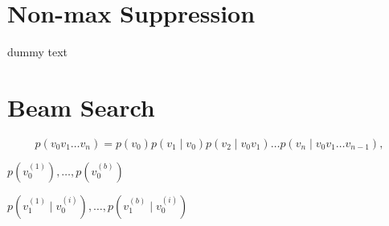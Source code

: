 \section{Non-max Suppression}\label{app:nms}
dummy text


\section{Beam Search}\label{app:bmsrch}

\begin{equation}
	p(v_0v_1 \ldots v_n) = p(v_0)p(v_1 \mid v_0)p(v_2 \mid v_0v_1) \ldots p(v_n \mid v_0v_1 \ldots v_{n-1}),
\end{equation}

$p(v_0^{(1)}),\ldots,p(v_0^{(b)})$

$p(v_1^{(1)} \mid v_0^{(i)}),\ldots,p(v_1^{(b)} \mid v_0^{(i)})$


